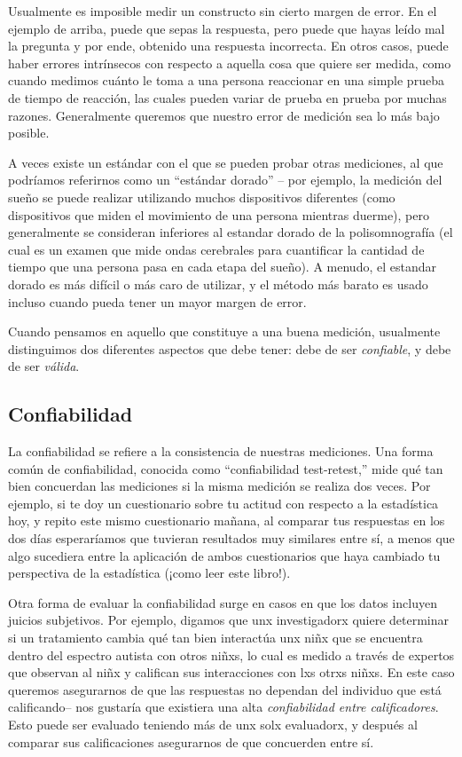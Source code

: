 \documentclass[
  12pt,
]{book}
\theoremstyle{definition}
\theoremstyle{definition}
\theoremstyle{definition}
\theoremstyle{remark}
\begin{document}
Usualmente es imposible medir un constructo sin cierto margen de error. En el ejemplo de arriba, puede que sepas la respuesta, pero puede que hayas leído mal la pregunta y por ende, obtenido una respuesta incorrecta. En otros casos, puede haber errores intrínsecos con respecto a aquella cosa que quiere ser medida, como cuando medimos cuánto le toma a una persona reaccionar en una simple prueba de tiempo de reacción, las cuales pueden variar de prueba en prueba por muchas razones. Generalmente queremos que nuestro error de medición sea lo más bajo posible.

A veces existe un estándar con el que se pueden probar otras mediciones, al que podríamos referirnos como un ``estándar dorado'' -- por ejemplo, la medición del sueño se puede realizar utilizando muchos dispositivos diferentes (como dispositivos que miden el movimiento de una persona mientras duerme), pero generalmente se consideran inferiores al estandar dorado de la polisomnografía (el cual es un examen que mide ondas cerebrales para cuantificar la cantidad de tiempo que una persona pasa en cada etapa del sueño). A menudo, el estandar dorado es más difícil o más caro de utilizar, y el método más barato es usado incluso cuando pueda tener un mayor margen de error.

Cuando pensamos en aquello que constituye a una buena medición, usualmente distinguimos dos diferentes aspectos que debe tener: debe de ser \emph{confiable}, y debe de ser \emph{válida}.

\hypertarget{confiabilidad}{%
\subsection{Confiabilidad}\label{confiabilidad}}

La confiabilidad se refiere a la consistencia de nuestras mediciones. Una forma común de confiabilidad, conocida como ``confiabilidad test-retest,'' mide qué tan bien concuerdan las mediciones si la misma medición se realiza dos veces. Por ejemplo, si te doy un cuestionario sobre tu actitud con respecto a la estadística hoy, y repito este mismo cuestionario mañana, al comparar tus respuestas en los dos días esperaríamos que tuvieran resultados muy similares entre sí, a menos que algo sucediera entre la aplicación de ambos cuestionarios que haya cambiado tu perspectiva de la estadística (¡como leer este libro!).

Otra forma de evaluar la confiabilidad surge en casos en que los datos incluyen juicios subjetivos. Por ejemplo, digamos que unx investigadorx quiere determinar si un tratamiento cambia qué tan bien interactúa unx niñx que se encuentra dentro del espectro autista con otros niñxs, lo cual es medido a través de expertos que observan al niñx y califican sus interacciones con lxs otrxs niñxs. En este caso queremos asegurarnos de que las respuestas no dependan del individuo que está calificando-- nos gustaría que existiera una alta \emph{confiabilidad entre calificadores}. Esto puede ser evaluado teniendo más de unx solx evaluadorx, y después al comparar sus calificaciones asegurarnos de que concuerden entre sí.
\end{document}
